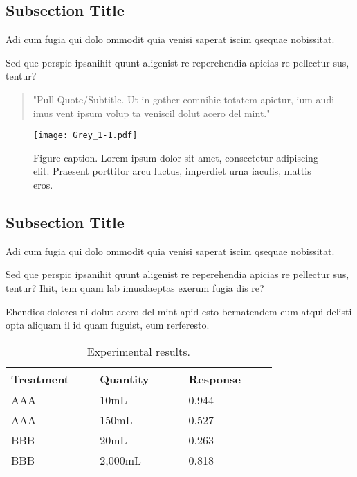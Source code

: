\documentclass[
]{ImperialPoster}
\begin{document}
\begin{multicols}{3} %
	
	
	\subsection{Subsection Title}
	
	Adi cum fugia qui dolo ommodit quia venisi saperat iscim qsequae nobissitat.
	
	Sed que perspic ipsanihit quunt aligenist re reperehendia \textcolor{ICLBlue}{apicias re pellectur sus, tentur?}
		
	\begin{quote}
		"Pull Quote/Subtitle. Ut in gother comnihic totatem apietur, ium audi imus vent ipsum volup ta veniscil dolut acero del mint."
	\end{quote}
	
	\begin{figure}[H] %
		\texttt{[image: Grey\_1-1.pdf]} %
		\caption{Figure caption. Lorem ipsum dolor sit amet, consectetur adipiscing elit. Praesent porttitor arcu luctus, imperdiet urna iaculis, mattis eros.}
	\end{figure}
	
	\subsection{Subsection Title}
	
	Adi cum fugia qui dolo ommodit quia venisi saperat iscim qsequae nobissitat.
	
	Sed que perspic ipsanihit quunt aligenist re reperehendia apicias re pellectur sus, tentur? Ihit, tem quam lab imusdaeptas exerum fugia dis re?
	
	Ehendios dolores ni dolut acero del mint apid esto bernatendem eum atqui delisti opta aliquam il id quam fuguist, eum rerferesto.
	
	\begin{table}[H] %
		\caption{Experimental results.}
		\begin{tabular}{L{0.26\linewidth} C{0.26\linewidth} R{0.26\linewidth}}
			\toprule
			Treatment & Quantity & Response\\
			\midrule
			AAA & 10mL & 0.944\\
			AAA & 150mL & 0.527\\
			BBB & 20mL & 0.263\\
			BBB & 2,000mL & 0.818\\
			\bottomrule
		\end{tabular}
	\end{table}
	

\end{multicols}
\end{document}
